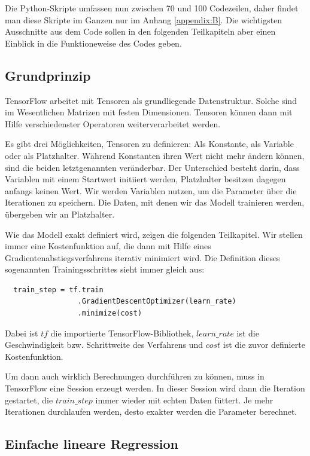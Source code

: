 Die Python-Skripte umfassen nun zwischen 70 und 100 Codezeilen, daher findet man diese Skripte im Ganzen nur im Anhang \ref{appendix:B}. Die wichtigsten Ausschnitte aus dem Code sollen in den folgenden Teilkapiteln aber einen Einblick in die Funktioneweise des Codes geben.

\subsection{Grundprinzip}
\label{subsection:3:3:1}

TensorFlow arbeitet mit Tensoren als grundliegende Datenstruktur. Solche sind im Wesentlichen Matrizen mit festen Dimensionen. Tensoren können dann mit Hilfe verschiedenster Operatoren weiterverarbeitet werden.

Es gibt drei Möglichkeiten, Tensoren zu definieren: Als Konstante, als Variable oder als Platzhalter. Während Konstanten ihren Wert nicht mehr ändern können, sind die beiden letztgenannten veränderbar. Der Unterschied besteht darin, dass Variablen mit einem Startwert initiiert werden, Platzhalter besitzen dagegen anfangs keinen Wert. Wir werden Variablen nutzen, um die Parameter über die Iterationen zu speichern. Die Daten, mit denen wir das Modell trainieren werden, übergeben wir an Platzhalter.

Wie das Modell exakt definiert wird, zeigen die folgenden Teilkapitel. Wir stellen immer eine Kostenfunktion auf, die dann mit Hilfe eines Gradientenabstiegsverfahrens iterativ minimiert wird. Die Definition dieses sogenannten Trainingsschrittes sieht immer gleich aus:

\begin{verbatim}
  train_step = tf.train
                 .GradientDescentOptimizer(learn_rate)
                 .minimize(cost)
\end{verbatim}

Dabei ist $tf$ die importierte TensorFlow-Bibliothek, $learn\_rate$ ist die Geschwindigkeit bzw. Schrittweite des Verfahrens und $cost$ ist die zuvor definierte Kostenfunktion.

Um dann auch wirklich Berechnungen durchführen zu können, muss in TensorFlow eine Session erzeugt werden. In dieser Session wird dann die Iteration gestartet, die $train\_step$ immer wieder mit echten Daten füttert. Je mehr Iterationen durchlaufen werden, desto exakter werden die Parameter berechnet.

\subsection{Einfache lineare Regression}
\label{subsection:3:3:2}

